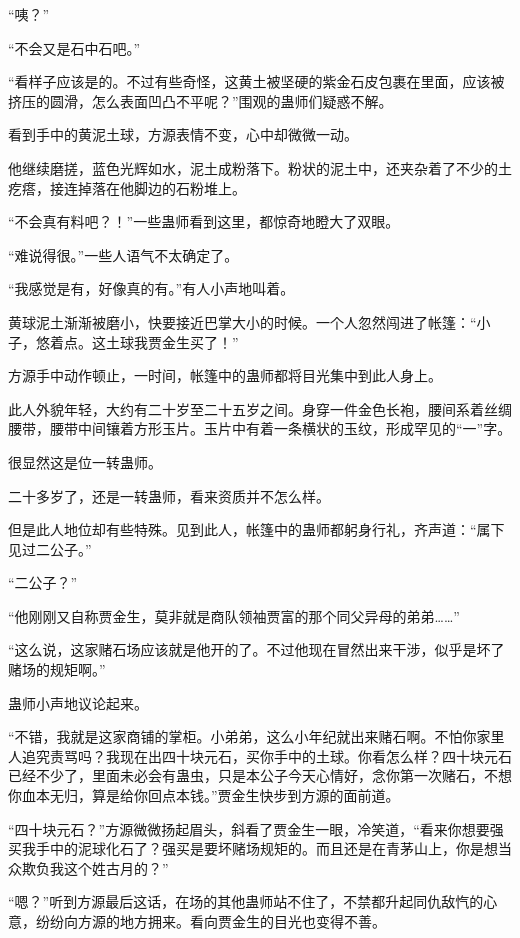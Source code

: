 
\begin{this_body}

“咦？”

“不会又是石中石吧。”

“看样子应该是的。不过有些奇怪，这黄土被坚硬的紫金石皮包裹在里面，应该被挤压的圆滑，怎么表面凹凸不平呢？”围观的蛊师们疑惑不解。

看到手中的黄泥土球，方源表情不变，心中却微微一动。

他继续磨搓，蓝色光辉如水，泥土成粉落下。粉状的泥土中，还夹杂着了不少的土疙瘩，接连掉落在他脚边的石粉堆上。

“不会真有料吧？！”一些蛊师看到这里，都惊奇地瞪大了双眼。

“难说得很。”一些人语气不太确定了。

“我感觉是有，好像真的有。”有人小声地叫着。

黄球泥土渐渐被磨小，快要接近巴掌大小的时候。一个人忽然闯进了帐篷：“小子，悠着点。这土球我贾金生买了！”

方源手中动作顿止，一时间，帐篷中的蛊师都将目光集中到此人身上。

此人外貌年轻，大约有二十岁至二十五岁之间。身穿一件金色长袍，腰间系着丝绸腰带，腰带中间镶着方形玉片。玉片中有着一条横状的玉纹，形成罕见的“一”字。

很显然这是位一转蛊师。

二十多岁了，还是一转蛊师，看来资质并不怎么样。

但是此人地位却有些特殊。见到此人，帐篷中的蛊师都躬身行礼，齐声道：“属下见过二公子。”

“二公子？”

“他刚刚又自称贾金生，莫非就是商队领袖贾富的那个同父异母的弟弟……”

“这么说，这家赌石场应该就是他开的了。不过他现在冒然出来干涉，似乎是坏了赌场的规矩啊。”

蛊师小声地议论起来。

“不错，我就是这家商铺的掌柜。小弟弟，这么小年纪就出来赌石啊。不怕你家里人追究责骂吗？我现在出四十块元石，买你手中的土球。你看怎么样？四十块元石已经不少了，里面未必会有蛊虫，只是本公子今天心情好，念你第一次赌石，不想你血本无归，算是给你回点本钱。”贾金生快步到方源的面前道。

“四十块元石？”方源微微扬起眉头，斜看了贾金生一眼，冷笑道，“看来你想要强买我手中的泥球化石了？强买是要坏赌场规矩的。而且还是在青茅山上，你是想当众欺负我这个姓古月的？”

“嗯？”听到方源最后这话，在场的其他蛊师站不住了，不禁都升起同仇敌忾的心意，纷纷向方源的地方拥来。看向贾金生的目光也变得不善。


\end{this_body}
